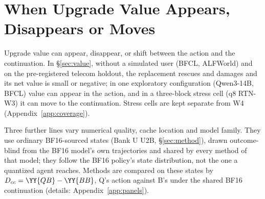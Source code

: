 \section{When Upgrade Value Appears, Disappears or Moves}
\label{sec:scope}
\label{sec:r3}

Upgrade value can appear, disappear, or shift between the action and the continuation. In \S\ref{sec:value}, without a simulated user (BFCL, ALFWorld) and on the pre-registered telecom holdout, the replacement rescues and damages and its net value is small or negative; in one exploratory configuration (Qwen3-14B, BFCL) value can appear in the action, and in a three-block stress cell (q8 RTN-W3) it can move to the continuation. Stress cells are kept separate from W4 (Appendix~\ref{app:coverage}).

Three further lines vary numerical quality, cache location and model family. They use ordinary BF16-sourced states (Bank U U2B, \S\ref{sec:method}), drawn outcome-blind from the BF16 model's own trajectories and shared by every method of that model; they follow the BF16 policy's state distribution, not the one a quantized agent reaches. Methods are compared on these states by $D_{cc}=\YY{QB}-\YY{BB}$, Q's action against B's under the shared BF16 continuation (details: Appendix~\ref{app:panels}). %

